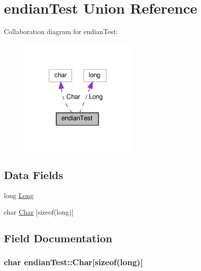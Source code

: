 \hypertarget{unionendianTest}{}\section{endian\+Test Union Reference}
\label{unionendianTest}


Collaboration diagram for endian\+Test\+:
\nopagebreak
\begin{figure}[H]
\begin{center}
\leavevmode
\includegraphics[width=168pt]{unionendianTest__coll__graph}
\end{center}
\end{figure}
\subsection*{Data Fields}
\begin{DoxyCompactItemize}
\item 
long \hyperlink{unionendianTest_a671978d0955d8687cf57a7a29bae22d3}{Long}
\item 
char \hyperlink{unionendianTest_a007acf3029fe6ee305739c00f69a829f}{Char} \mbox{[}sizeof(long)\mbox{]}
\end{DoxyCompactItemize}


\subsection{Field Documentation}
\subsubsection[{\texorpdfstring{Char}{Char}}]{\setlength{\rightskip}{0pt plus 5cm}char endian\+Test\+::\+Char\mbox{[}sizeof(long)\mbox{]}}\hypertarget{unionendianTest_a007acf3029fe6ee305739c00f69a829f}{}\label{unionendianTest_a007acf3029fe6ee305739c00f69a829f}
